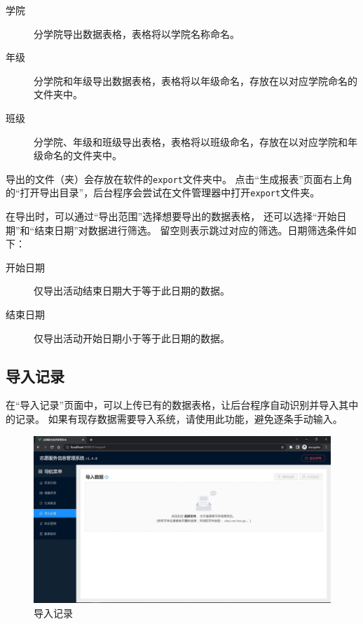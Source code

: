 \documentclass[12pt,titlepage]{article}
\begin{document}
\begin{description}
    \item[学院] 分学院导出数据表格，表格将以学院名称命名。
    \item[年级] 分学院和年级导出数据表格，表格将以年级命名，存放在以对应学院命名的文件夹中。
    \item[班级] 分学院、年级和班级导出表格，表格将以班级命名，存放在以对应学院和年级命名的文件夹中。
\end{description}

导出的文件（夹）会存放在软件的\texttt{export}文件夹中。
点击“生成报表”页面右上角的“打开导出目录”，后台程序会尝试在文件管理器中打开\texttt{export}文件夹。

在导出时，可以通过“导出范围”选择想要导出的数据表格，
还可以选择“开始日期”和“结束日期”对数据进行筛选。
留空则表示跳过对应的筛选。日期筛选条件如下：

\begin{description}
    \item[开始日期] 仅导出活动结束日期大于等于此日期的数据。
    \item[结束日期] 仅导出活动开始日期小于等于此日期的数据。
\end{description}

\subsection{导入记录}

在“导入记录”页面中，可以上传已有的数据表格，让后台程序自动识别并导入其中的记录。
如果有现存数据需要导入系统，请使用此功能，避免逐条手动输入。

\begin{figure}[htbp]
    \centering
    \includegraphics[width=\textwidth]{../screenshots/import.jpg}
    \caption{导入记录}
\end{figure}
\end{document}
